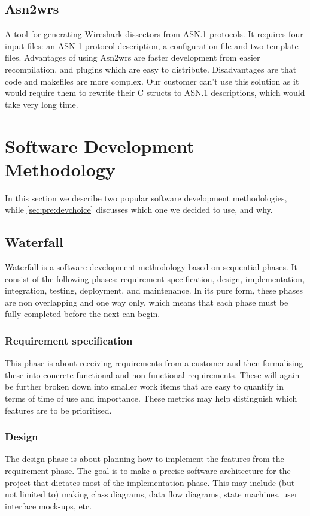 \subsection{Asn2wrs}
A tool for generating Wireshark dissectors from ASN.1 protocols. It requires
four input files: an ASN-1 protocol description, a configuration file and two
template files. Advantages of using Asn2wrs are faster development from
easier recompilation, and plugins which are easy to distribute. Disadvantages
are that code and makefiles are more complex. Our customer can't use this
solution as it would require them to rewrite their C structs to ASN.1
descriptions, which would take very long time.


\section{Software Development Methodology}
\label{sec:pre:method}
In this section we describe two popular software development methodologies,
while \autoref{sec:pre:devchoice} discusses which one we decided to use, and
why.

\subsection{Waterfall}
\label{sec:pre:waterfall}
Waterfall is a software development methodology based on sequential phases.
It consist of the following phases: requirement specification, design,
implementation, integration, testing, deployment, and maintenance. In its pure
form, these phases are non overlapping and one way only, which means that each
phase must be fully completed before the next can begin.

\subsubsection{Requirement specification}
This phase is about receiving requirements from a customer and then formalising
these into concrete functional and non-functional requirements. These will
again be further broken down into smaller work items that are easy to quantify
in terms of time of use and importance. These metrics may help distinguish
which features are to be prioritised.

\subsubsection{Design}
The design phase is about planning how to implement the features from the
requirement phase. The goal is to make a precise software architecture for the
project that dictates most of the implementation phase. This may include (but
not limited to) making class diagrams, data flow diagrams, state machines, user
interface mock-ups, etc.

